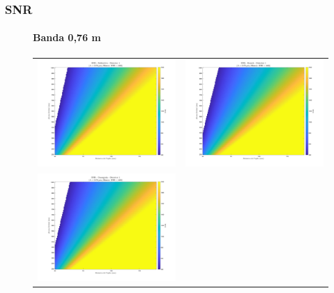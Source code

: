\subsubsection{SNR}

\begin{landscape}
\begin{figure}[p]
\centering
\setlength{\tabcolsep}{2pt}
\renewcommand{\arraystretch}{0}

\paragraph{Banda 0,76 \textmu m}
\begin{tabular}{cc}
\includegraphics[width=0.48\linewidth]{4.Payload/SNR/SNR_Lambda3_Detector4_Telescopio1_heatmap.jpg} &
\includegraphics[width=0.48\linewidth]{4.Payload/SNR/SNR_Lambda3_Detector4_Telescopio2_heatmap.jpg} \\
\includegraphics[width=0.48\linewidth]{4.Payload/SNR/SNR_Lambda3_Detector4_Telescopio3_heatmap.jpg} &

\end{tabular}
\end{figure}
\end{landscape}
